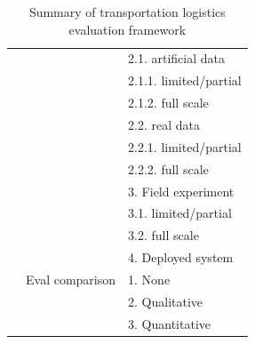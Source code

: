 \documentclass[11pt,letterpaper,onecolumn,twoside,openright,final]{report}
\begin{document}
\begin{table}[htbp]
\begin{tabular}{|l|p{}|p{}|}
          &       &   2.1. artificial data \\
          &       &     2.1.1. limited/partial \\
          &       &     2.1.2. full scale \\
          &       &   2.2. real data \\
          &       &     2.2.1. limited/partial \\
          &       &     2.2.2. full scale \\
          &       & 3. Field experiment \\
          &       &   3.1. limited/partial \\
          &       &   3.2. full scale \\
          &       & 4. Deployed system \\
          \cline{2-3}
          & Eval comparison & 1. None \\
          &       & 2. Qualitative \\
          &       & 3. Quantitative \\
    \hline
    \end{tabular}%
  \caption{Summary of transportation logistics evaluation framework}
  \label{tab:transport-logistics-eval-framework}%
\end{table}%
\end{document}
